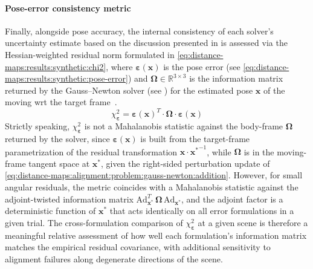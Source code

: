 \paragraph{Pose-error consistency metric}
Finally, alongside pose accuracy, the internal consistency of each solver's
uncertainty estimate based on the discussion presented in
 is assessed via the
Hessian-weighted residual norm formulated in
\eqref{eq:distance-maps:results:synthetic:chi2}, where
$\boldsymbol{\varepsilon}\!\left(\mathbf{x}\right)$ is the pose error
(see \eqref{eq:distance-maps:results:synthetic:pose-error}) and
$\boldsymbol{\Omega} \in \mathbb{R}^{3 \times 3}$ is the information matrix
returned by the Gauss--Newton solver (see
) for the estimated
pose $\mathbf{x}$ of the moving \gls{wrt} the target
frame~\cite{kummerle:ar:2009}.
\begin{equation}
\label{eq:distance-maps:results:synthetic:chi2}
\chi_{\boldsymbol{\varepsilon}}^2 =
    \boldsymbol{\varepsilon}\!\left(\mathbf{x}\right)^T \cdot
    \boldsymbol{\Omega} \cdot
    \boldsymbol{\varepsilon}\!\left(\mathbf{x}\right)
\end{equation}
Strictly speaking, $\chi^2_{\boldsymbol{\varepsilon}}$ is not a Mahalanobis
statistic against the body-frame $\boldsymbol{\Omega}$ returned by the
solver, since $\boldsymbol{\varepsilon}\!\left(\mathbf{x}\right)$ is built
from the target-frame parametrization of the residual transformation
$\mathbf{x}\cdot{\mathbf{x}^{*}}^{-1}$, while $\boldsymbol{\Omega}$ is in
the moving-frame tangent space at $\mathbf{x}^*$, given the right-sided
perturbation update of
\eqref{eq:distance-maps:alignment:problem:gauss-newton:addition}. However, for
small angular residuals, the metric coincides with a Mahalanobis statistic
against the adjoint-twisted information matrix
$\mathrm{Ad}_{\mathbf{x}^*}^T\,\boldsymbol{\Omega}\,\mathrm{Ad}_{\mathbf{x}^*}$,
and the adjoint factor is a deterministic function of $\mathbf{x}^*$ that
acts identically on all error formulations in a given trial. The
cross-formulation comparison of $\chi^2_{\boldsymbol{\varepsilon}}$ at a
given scene is therefore a meaningful relative assessment of how well
each formulation's information matrix matches the empirical residual
covariance, with additional sensitivity to alignment failures along
degenerate directions of the scene.

